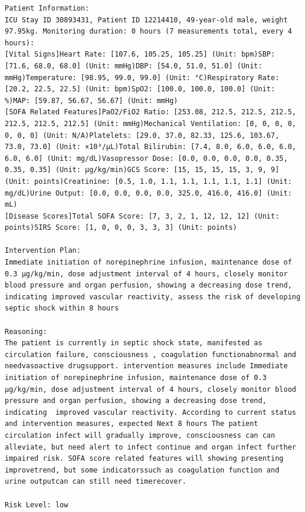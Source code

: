 \documentclass{article}
\begin{document}
\begin{lstlisting}[caption={Result for Patient 30893431}, label={lst:30893431}]
Patient Information:
ICU Stay ID 30893431, Patient ID 12214410, 49-year-old male, weight 97.95kg. Monitoring duration: 0 hours (7 measurements total, every 4 hours):
[Vital Signs]Heart Rate: [107.6, 105.25, 105.25] (Unit: bpm)SBP: [71.6, 68.0, 68.0] (Unit: mmHg)DBP: [54.0, 51.0, 51.0] (Unit: mmHg)Temperature: [98.95, 99.0, 99.0] (Unit: °C)Respiratory Rate: [20.2, 22.5, 22.5] (Unit: bpm)SpO2: [100.0, 100.0, 100.0] (Unit: %)MAP: [59.87, 56.67, 56.67] (Unit: mmHg)
[SOFA Related Features]PaO2/FiO2 Ratio: [253.08, 212.5, 212.5, 212.5, 212.5, 212.5, 212.5] (Unit: mmHg)Mechanical Ventilation: [0, 0, 0, 0, 0, 0, 0] (Unit: N/A)Platelets: [29.0, 37.0, 82.33, 125.6, 103.67, 73.0, 73.0] (Unit: ×10³/μL)Total Bilirubin: [7.4, 8.0, 6.0, 6.0, 6.0, 6.0, 6.0] (Unit: mg/dL)Vasopressor Dose: [0.0, 0.0, 0.0, 0.0, 0.35, 0.35, 0.35] (Unit: μg/kg/min)GCS Score: [15, 15, 15, 15, 3, 9, 9] (Unit: points)Creatinine: [0.5, 1.0, 1.1, 1.1, 1.1, 1.1, 1.1] (Unit: mg/dL)Urine Output: [0.0, 0.0, 0.0, 0.0, 325.0, 416.0, 416.0] (Unit: mL)
[Disease Scores]Total SOFA Score: [7, 3, 2, 1, 12, 12, 12] (Unit: points)SIRS Score: [1, 0, 0, 0, 3, 3, 3] (Unit: points)

Intervention Plan:
Immediate initiation of norepinephrine infusion, maintenance dose of 0.3 μg/kg/min, dose adjustment interval of 4 hours, closely monitor blood pressure and organ perfusion, showing a decreasing dose trend, indicating improved vascular reactivity, assess the risk of developing septic shock within 8 hours

Reasoning:
The patient is currently in septic shock state, manifested as circulation failure, consciousness , coagulation functionabnormal and needvasoactive drugsupport. intervention measures include Immediate initiation of norepinephrine infusion, maintenance dose of 0.3 μg/kg/min, dose adjustment interval of 4 hours, closely monitor blood pressure and organ perfusion, showing a decreasing dose trend, indicating  improved vascular reactivity. According to current status and intervention measures, expected Next 8 hours The patient circulation infect will gradually improve, consciousness can can alleviate, but need alert to infect continue and organ infect further impaired risk. SOFA score related features will showing presenting improvetrend, but some indicatorssuch as coagulation function and urine outputcan can still need timerecover.

Risk Level: low
\end{lstlisting}
\end{document}
